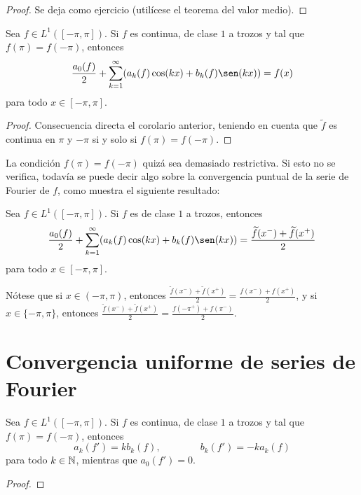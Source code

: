 \documentclass[a4paper, 12pt, extrafontsizes]{memoir}
\begin{document}
\begin{proof}
    Se deja como ejercicio (utilícese el teorema del valor medio).
\end{proof}

\begin{corollary}
    Sea $f \in L^1([-\pi,\pi])$. Si $f$ es continua, de clase $1$ a trozos y tal que $f(\pi) = f(-\pi)$, entonces
    \[\frac{a_0(f)}{2}+\sum_{k=1}^\infty (a_k(f)\cos(kx) + b_k(f)\sen(kx)) = f(x)\]
    para todo $x\in [-\pi,\pi]$.
\end{corollary}

\begin{proof}
    Consecuencia directa el corolario anterior, teniendo en cuenta que $\widetilde{f}$ es continua en $\pi$ y $-\pi$ si y solo si $f(\pi) = f(-\pi)$.
\end{proof}

La condición $f(\pi) = f(-\pi)$ quizá sea demasiado restrictiva. Si esto no se verifica, todavía se puede decir algo sobre la convergencia puntual de la serie de Fourier de $f$, como muestra el siguiente resultado:

\begin{theorem}
    Sea $f \in L^1([-\pi,\pi])$. Si $f$ es de clase $1$ a trozos, entonces
    \[\frac{a_0(f)}{2}+\sum_{k=1}^\infty (a_k(f)\cos(kx) + b_k(f)\sen(kx)) = \frac{\widetilde{f}(x^-)+\widetilde{f}(x^+)}{2}\]
    para todo $x \in [-\pi,\pi]$.
\end{theorem}

Nótese que si $x \in (-\pi,\pi)$, entonces $\frac{\widetilde{f}(x^-)+\widetilde{f}(x^+)}{2} = \frac{{f}(x^-)+{f}(x^+)}{2}$, y si $x \in \{-\pi,\pi\}$, entonces $\frac{\widetilde{f}(x^-)+\widetilde{f}(x^+)}{2} = \frac{{f}(-\pi^+)+{f}(\pi^-)}{2}$.

\section{Convergencia uniforme de series de Fourier}

\begin{proposition}
    Sea $f \in L^1([-\pi,\pi])$. Si $f$ es continua, de clase $1$ a trozos y tal que $f(\pi) = f(-\pi)$, entonces
    \[a_k(f')=kb_k(f), \qquad \qquad b_k(f') = -ka_k(f)\]
    para todo $k \in \mathbb N$, mientras que $a_0(f')=0$.
\end{proposition}

\begin{proof}
    
\end{proof}
\end{document}
